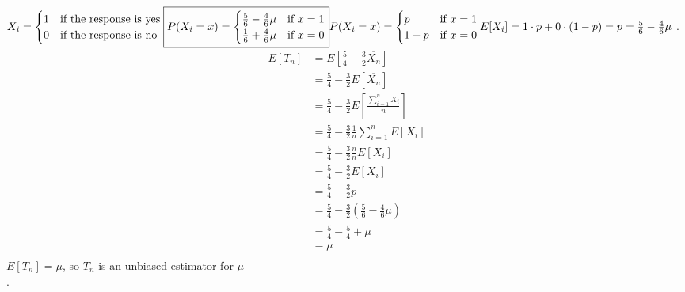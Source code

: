 \documentclass[12pt,border=4pt,multi]{article} %
\begin{document}
{\large
$X_i = \begin{cases}
1 & \text{if the response is yes}\\
0 & \text{if the response is no}\\
\end{cases}\\
\boxed{
P(X_i = x) = \begin{cases}
\frac{5}{6} - \frac{4}{6}\mu & \text{if } x = 1\\
\frac{1}{6} + \frac{4}{6}\mu & \text{if } x = 0\\
\end{cases}}\\
\\
P(X_i = x) = \begin{cases}
p & \text{if } x = 1\\
1 - p & \text{if } x = 0\\
\end{cases}\\
E[X_i] = 1 \cdot p + 0 \cdot (1 - p) = p = \frac{5}{6} - \frac{4}{6}\mu$}
\newpage
{}.\\
\begin{align*}
E[T_n] &= E\left[\frac{5}{4} - \frac{3}{2}\overline{X_n}\right]\\
&= \frac{5}{4} - \frac{3}{2}E[\overline{X_n}]\\
&= \frac{5}{4} - \frac{3}{2}E\left[\frac{\sum_{i = 1}^n X_i}{n}\right]\\
&= \frac{5}{4} - \frac{3}{2}\frac{1}{n}\sum_{i = 1}^n E\left[X_i\right]\\
&= \frac{5}{4} - \frac{3}{2}\frac{n}{n} E[X_i]\\
&= \frac{5}{4} - \frac{3}{2} E[X_i]\\
&= \frac{5}{4} - \frac{3}{2} p\\
&= \frac{5}{4} - \frac{3}{2} \left(\frac{5}{6} - \frac{4}{6}\mu\right)\\
&= \frac{5}{4} - \frac{5}{4} + \mu\\
&= \mu\\
\end{align*}
$E[T_n] = \mu$, so $T_n$ is an unbiased estimator for $\mu$\\
\newpage
{}. 
\end{document}
